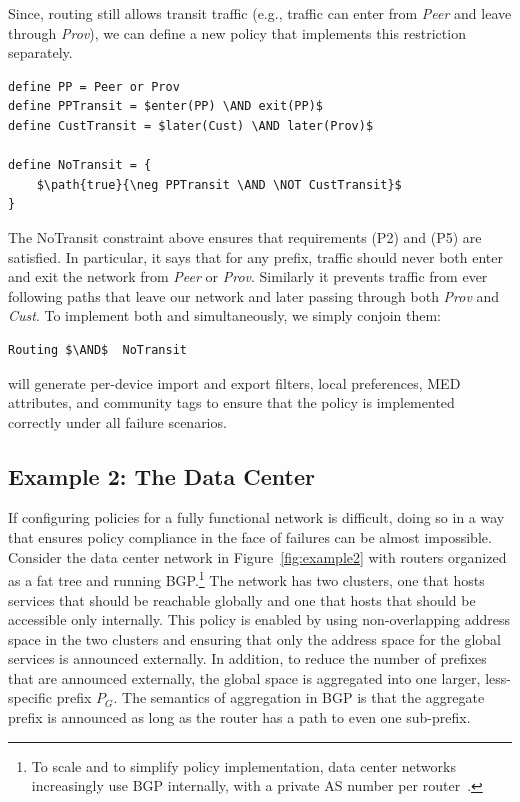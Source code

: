 Since, routing still allows transit traffic (e.g., traffic can enter from \textit{Peer} and leave through \textit{Prov}), we can define a new policy that
implements this restriction separately.

\begin{lstlisting}[mathescape=true]
define PP = Peer or Prov
define PPTransit = $enter(PP) \AND exit(PP)$
define CustTransit = $later(Cust) \AND later(Prov)$

define NoTransit = {
    $\path{true}{\neg PPTransit \AND \NOT CustTransit}$
}
\end{lstlisting}

The \textsf{NoTransit} constraint above ensures that requirements (P2) and (P5) are satisfied. In particular, it says that for any prefix, traffic should never both enter and exit the network from \textit{Peer} or \textit{Prov}. Similarly it prevents traffic from ever following paths that leave our network and later passing through both \textit{Prov} and \textit{Cust}.  To implement both 
and  simultaneously, we simply conjoin them:

\begin{lstlisting}[mathescape=true]
Routing $\AND$  NoTransit
\end{lstlisting}

\sysname will generate per-device import and export filters, local preferences, 
MED attributes, and community tags to ensure that the policy is 
implemented correctly under all failure scenarios.

\subsection{Example 2:  The Data Center}

If configuring policies for a fully functional network is difficult, doing so in a way that ensures policy compliance in the face of failures can be almost impossible. Consider the data center network in Figure~\ref{fig:example2} with routers organized as a fat tree and running BGP.\footnote{To scale and to simplify policy implementation, data center networks increasingly use BGP internally, with a private AS number per router~\cite{bgp-in-dc-rfc}.} The network has two clusters, one that hosts services that should be reachable globally and one that hosts that should be accessible only internally. This policy is enabled by using non-overlapping address space in the two clusters and ensuring that only the address space for the global services is announced externally. In addition, to reduce the number of prefixes that are announced externally, the global space is aggregated into one larger, less-specific prefix $P_G$. The semantics of aggregation in BGP is that the aggregate prefix is announced as long as the router has a path to even one sub-prefix.

